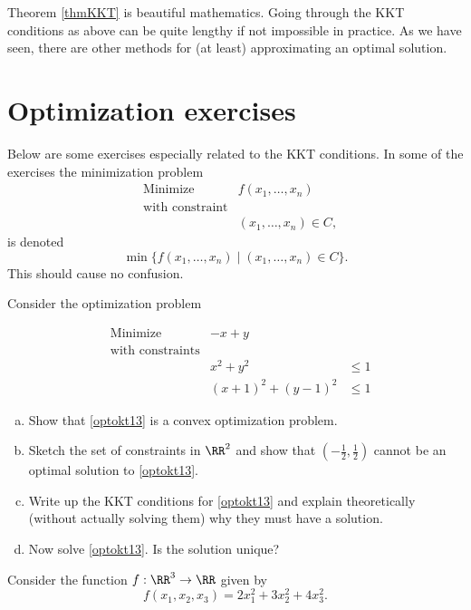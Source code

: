 \documentclass{article}
\begin{document}
Theorem \ref{thmKKT} is beautiful mathematics. Going through the KKT
conditions as above can be quite lengthy if not impossible in
practice. As we have seen, there are other methods for (at least)
approximating an optimal solution.


\section{Optimization exercises}

Below are some exercises especially related to the KKT conditions. In some of the
exercises the minimization problem
  \begin{align}
    &\text{Minimize} &f(x_1, \dots, x_n)\\
    &\text{with constraint}\\
    &&(x_1, \dots, x_n)\in C,
  \end{align}
  is denoted
  $$
  \min\{f(x_1, \dots, x_n) \mid (x_1, \dots, x_n)\in C\}.
  $$
This should cause no confusion.
  
\beginshex

Consider the optimization problem

  \begin{align}\label{optokt13}
    &\text{Minimize} &-x + y\\
    &\text{with constraints}\\
    &&x^2  +y^2 &\leq 1\\
    &&(x+1)^2 + (y-1)^2&\leq 1
  \end{align}

  \begin{enumerate}[(a)]
  \item
    Show that \eqref{optokt13} is a convex optimization problem.
\item
  Sketch the set of constraints in $\RR^2$ and show that $\left(-\frac{1}{2}, \frac{1}{2}\right)$ cannot be an optimal
  solution to \eqref{optokt13}.
\item
  Write up the KKT conditions for \eqref{optokt13} and explain theoretically (without actually solving them) why
  they must have a solution.
  \item
    Now solve \eqref{optokt13}. Is the solution unique?
\end{enumerate}


\endshex


\beginshex

Consider the function $f:\RR^3\rightarrow \RR$ given by
$$
f(x_1, x_2, x_3) = 2 x_1^2 + 3 x_2^2 + 4 x_3^2.
$$
\end{document}
